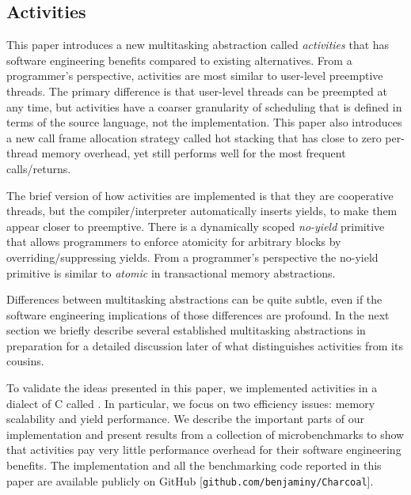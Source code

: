 \documentclass[9pt,preprint]{sigplanconf}
\begin{document}
\subsection{Activities}

This paper introduces a new multitasking abstraction called \emph{activities} that has software engineering benefits compared to existing alternatives.
From a programmer's perspective, activities are most similar to user-level preemptive threads.
The primary difference is that user-level threads can be preempted at any time, but activities have a coarser granularity of scheduling that is defined in terms of the source language, not the implementation.
This paper also introduces a new call frame allocation strategy called hot stacking that has close to zero per-thread memory overhead, yet still performs well for the most frequent calls/returns.

The brief version of how activities are implemented is that they are cooperative threads, but the compiler/interpreter automatically inserts yields, to make them appear closer to preemptive.
There is a dynamically scoped \emph{no-yield} primitive that allows programmers to enforce atomicity for arbitrary blocks by overriding/suppressing yields.
From a programmer's perspective the no-yield primitive is similar to \emph{atomic} in transactional memory abstractions.

Differences between multitasking abstractions can be quite subtle, even if the software engineering implications of those differences are profound.
In the next section we briefly describe several established multitasking abstractions in preparation for a detailed discussion later of what distinguishes activities from its cousins.

To validate the ideas presented in this paper, we implemented activities in a dialect of C called \charcoal{}.
In particular, we focus on two efficiency issues: memory scalability and yield performance.
We describe the important parts of our implementation and present results from a collection of microbenchmarks to show that activities pay very little performance overhead for their software engineering benefits.
The \charcoal{} implementation and all the benchmarking code reported in this paper are available publicly on GitHub [\texttt{github.com/benjaminy/Charcoal}].

\end{document}
